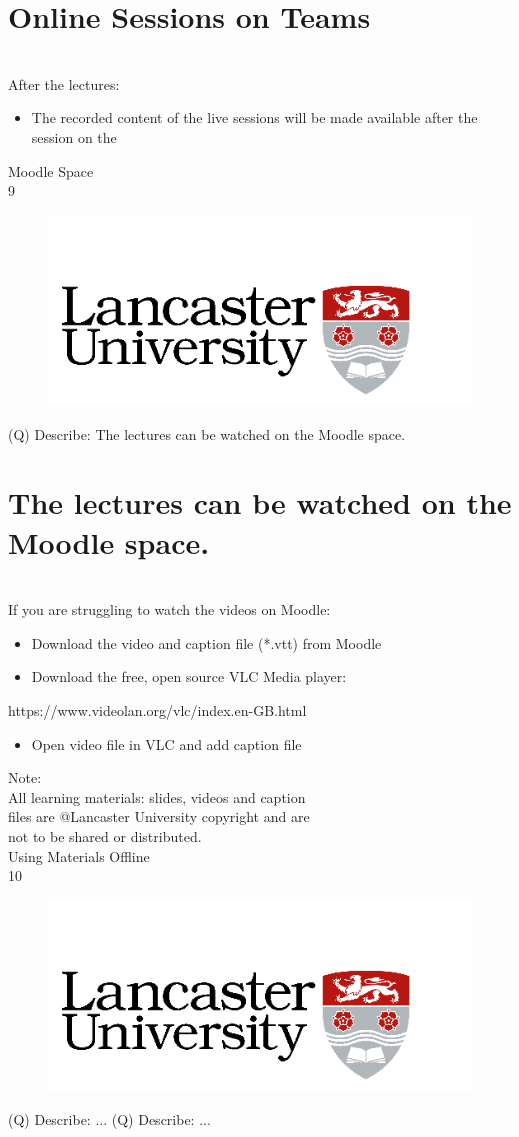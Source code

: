 \documentclass[12pt]{article}
\begin{document}
\section{Online Sessions on Teams}
\\
After the lectures:\\
\begin{itemize}
  \item The recorded content of the live sessions will be made available after the session on the 
\end{itemize}
Moodle Space\\
9\\
\begin{figure}[H]
\includegraphics[width=0.5\linewidth]{page1-image-1.png}
\end{figure}
\clearpage
(Q)
Describe: The lectures can be watched on the Moodle space.
\clearpage
\section{The lectures can be watched on the Moodle space.}
\\
If you are struggling to watch the videos on Moodle:\\
\begin{itemize}
  \item Download the video and caption file (*.vtt) from Moodle
  \item Download the free, open source VLC Media player: 
\end{itemize}
https://www.videolan.org/vlc/index.en-GB.html\\
\begin{itemize}
  \item Open video file in VLC and add caption file
\end{itemize}
Note:\\
All learning materials: slides, videos and caption\\
files are @Lancaster University copyright and are \\
not to be shared or distributed.\\
Using Materials Offline\\
10\\
\begin{figure}[H]
\includegraphics[width=0.5\linewidth]{page1-image-1.png}
\end{figure}
\clearpage
(Q)
Describe: ...
\clearpage
\clearpage
(Q)
Describe: ...
\clearpage
\\
\end{document}
